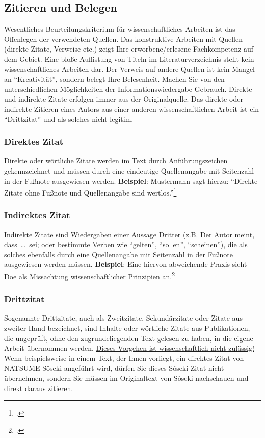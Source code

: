 \documentclass{japuzk}
\begin{document}
\subsection{Zitieren und Belegen}
Wesentliches Beurteilungskriterium für wissenschaftliches Arbeiten ist das Offenlegen der verwendeten Quellen. Das konstruktive Arbeiten mit Quellen (direkte Zitate, Verweise etc.) zeigt Ihre erworbene/erlesene Fachkompetenz auf dem Gebiet. Eine bloße Auflistung von Titeln im Literaturverzeichnis stellt kein wissenschaftliches Arbeiten dar. Der Verweis auf andere Quellen ist kein Mangel an \enquote{Kreativität}, sondern belegt Ihre Belesenheit. Machen Sie von den unterschiedlichen Möglichkeiten der Informationswiedergabe Gebrauch. Direkte und indirekte Zitate erfolgen immer aus der Originalquelle. Das direkte oder indirekte Zitieren eines Autors aus einer anderen wissenschaftlichen Arbeit ist ein \enquote{Drittzitat} und als solches nicht legitim.

\subsubsection{Direktes Zitat}
Direkte oder wörtliche Zitate werden im Text durch Anführungszeichen gekennzeichnet und müssen durch eine eindeutige Quellenangabe mit Seitenzahl in der Fußnote ausgewiesen werden.\newline
\textbf{Beispiel}: Mustermann sagt hierzu: \enquote{Direkte Zitate ohne Fußnote und Quellenangabe sind wertlos.}\footcite[12]{muster:quellen}

\subsubsection{Indirektes Zitat}
Indirekte Zitate sind Wiedergaben einer Aussage Dritter (z.B. Der Autor meint, dass~\ldots~sei; oder bestimmte Verben wie \enquote{gelten}, \enquote{sollen}, \enquote{scheinen}), die als solches ebenfalls durch eine Quellenangabe mit Seitenzahl in der Fußnote ausgewiesen werden müssen.\newline
\textbf{Beispiel}: Eine hiervon abweichende Praxis sieht Doe als Missachtung wissenschaftlicher Prinzipien an.\footcite[13\psq]{doe:references}

\subsubsection{Drittzitat}
Sogenannte Drittzitate, auch als Zweitzitate, Sekundärzitate oder Zitate aus zweiter Hand bezeichnet, sind Inhalte oder wörtliche Zitate aus Publikationen, die ungeprüft, ohne den zugrundeliegenden Text gelesen zu haben, in die eigene Arbeit übernommen werden. \underline{Dieses Vorgehen ist wissenschaftlich nicht zulässig!}\newline
Wenn beispielsweise in einem Text, der Ihnen vorliegt, ein direktes Zitat von NATSUME Sôseki angeführt wird, dürfen Sie dieses Sôseki-Zitat nicht übernehmen, sondern Sie müssen im Originaltext von Sôseki nachschauen und direkt daraus zitieren.
\end{document}
